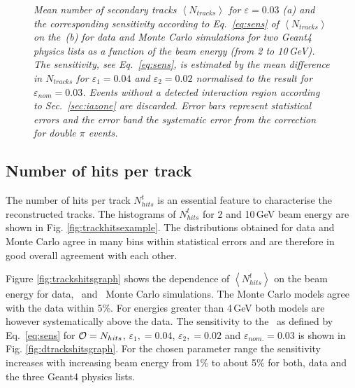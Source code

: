 \begin{figure}
\begin{subfigure}{0.5\textwidth}
		\caption{\label{fig:dtracksgraph}}
	\end{subfigure}
	\caption{\label{fig:fulltrackgraph} \sl Mean number of secondary tracks $\left<N_{tracks}\right>$ for $\varepsilon = 0.03$ (a) and the corresponding sensitivity according to Eq.~\ref{eq:sens} of $\left<N_{tracks}\right>$ on the \ep\,(b) for data and Monte Carlo simulations for two {\sc Geant}4 physics lists as a function of the beam energy (from 2 to 10\,GeV). The sensitivity, see Eq.~\ref{eq:sens}, is estimated by the mean difference in $N_{tracks}$ for $\varepsilon_1 = 0.04$ and $\varepsilon_2 = 0.02$ normalised to the result for $\varepsilon_{nom} = 0.03$. Events without a detected interaction region according to Sec.~\ref{sec:iazone} are discarded. Error bars represent statistical errors and the error band the systematic error from the correction for double $\pi$ events.}
\end{figure}



\subsection{Number of hits per track}
The number of hits per track $N_{hits}^t$ is an essential feature to characterise the reconstructed tracks. 
The histograms of $N_{hits}^t$ for 2 and 10\,GeV beam energy are shown in Fig. \ref{fig:trackhitsexample}.
The distributions obtained for data and Monte Carlo agree in many bins within statistical errors and are therefore in good overall agreement with each other. 

Figure \ref{fig:trackshitsgraph} shows the dependence of $\left<N_{hits}^t\right>$ on the beam energy for data, \ftfp\ and \qgsp\ Monte Carlo simulations. The Monte Carlo models agree with the data within 5\%.  For energies greater than 4\,GeV both models are however systematically above  the data.
The sensitivity to the \ep\  as defined by Eq.~\ref{eq:sens} for ${\cal O}=N_{hits}$, $\varepsilon_{1},=0.04$, $\varepsilon_{2},=0.02$ and $\varepsilon_{nom.}=0.03$ is shown in Fig. \ref{fig:dtrackshitsgraph}. For the chosen parameter range the sensitivity increases with increasing beam energy from 1\% to about 5\% for both, data and the three {\sc Geant4} physics lists. 

